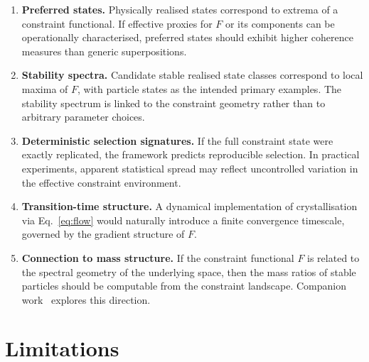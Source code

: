 \documentclass[12pt]{article}
\begin{document}
\begin{enumerate}
    \item \textbf{Preferred states.} Physically realised states correspond to extrema of a constraint functional. If effective proxies for $F$ or its components can be operationally characterised, preferred states should exhibit higher coherence measures than generic superpositions.

    \item \textbf{Stability spectra.} Candidate stable realised state classes correspond to local maxima of $F$, with particle states as the intended primary examples. The stability spectrum is linked to the constraint geometry rather than to arbitrary parameter choices.

    \item \textbf{Deterministic selection signatures.} If the full constraint state were exactly replicated, the framework predicts reproducible selection. In practical experiments, apparent statistical spread may reflect uncontrolled variation in the effective constraint environment.

    \item \textbf{Transition-time structure.} A dynamical implementation of crystallisation via Eq.~\eqref{eq:flow} would naturally introduce a finite convergence timescale, governed by the gradient structure of $F$.

    \item \textbf{Connection to mass structure.} If the constraint functional $F$ is related to the spectral geometry of the underlying space, then the mass ratios of stable particles should be computable from the constraint landscape. Companion work~\citep{SmartIV, SmartV} explores this direction.
\end{enumerate}

\section{Limitations}\label{sec:limits}
\end{document}
